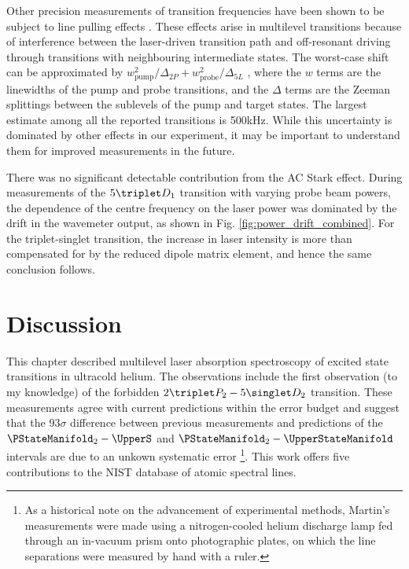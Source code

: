 	Other precision measurements of transition frequencies have been shown to be subject to line pulling effects \cite{Marsman15,Marsman15PRA}.
	These effects arise in multilevel transitions because of interference between the laser-driven transition path and off-resonant driving through transitions with neighbouring intermediate states.
	The worst-case shift can be approximated by $w_{\text{pump}}^2/\Delta_{2P} + w_{\text{probe}}^2/\Delta_{5L}$ \cite{Marsman15,Marsman15PRA}, where the $w$ terms are the linewidths of the pump and probe transitions, and the $\Delta$ terms are the Zeeman splittings between the sublevels of the pump and target states.
	The largest estimate among all the reported transitions is 500kHz.
	While this uncertainty is dominated by other effects in our experiment, it may be important to understand them for improved measurements in the future.

	There was no significant detectable contribution from the AC Stark effect.
	During measurements of the $5\triplet D_1$ transition with varying probe beam powers, the dependence of the centre frequency on the laser power was dominated by the drift in the wavemeter output, as shown in Fig.
	\ref{fig:power_drift_combined}.
	For the triplet-singlet transition, the increase in laser intensity is more than compensated for by the reduced dipole matrix element, and hence the same conclusion follows.
	



\section{Discussion}

	This chapter described multilevel laser absorption spectroscopy of excited state transitions in ultracold helium.
	The observations include the first observation (to my knowledge) of the forbidden $2\triplet P_2 - 5\singlet D_2$ transition.
	These measurements agree with current predictions within the error budget and suggest that the $93\sigma$ difference between previous measurements \cite{Martin60} and predictions \cite{Morton06} of the $\PStateManifold_2  -  \UpperS$ and $\PStateManifold_2  -  \UpperStateManifold$ intervals are due to an unkown systematic error \footnote{As a historical note on the advancement of experimental methods, Martin's measurements were made using a nitrogen-cooled helium discharge lamp fed through an in-vacuum prism onto photographic plates, on which the line separations were measured by hand with a ruler.}.
	This work offers five contributions to the NIST database of atomic spectral lines.

